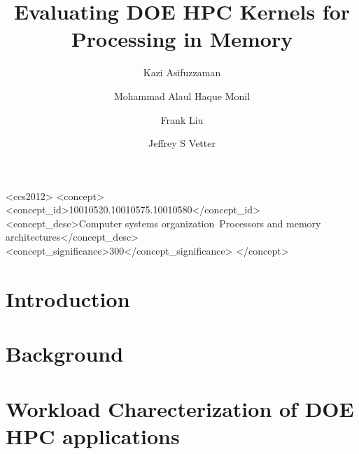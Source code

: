\documentclass[format=sigconf, review=false, anonymous=false]{acmart}
\begin{document}
\title{Evaluating DOE HPC Kernels for Processing in Memory}


\author{Kazi Asifuzzaman}

\author{Mohammad Alaul Haque Monil}

\author{Frank Liu}

\author{Jeffrey S Vetter}



\renewcommand{\shortauthors}{}

\begin{CCSXML}

<ccs2012>
<concept>
<concept_id>10010520.10010575.10010580</concept_id>
<concept_desc>Computer systems organization~Processors and memory architectures</concept_desc>
<concept_significance>300</concept_significance>
</concept>
\end{CCSXML}



\begin{abstract}
	 
\end{abstract}







\maketitle
\thispagestyle{empty}

\section{Introduction}
  

\section{Background}
  

\section{Workload Charecterization of DOE HPC applications}
\label{sec:workload}
  
\end{document}
